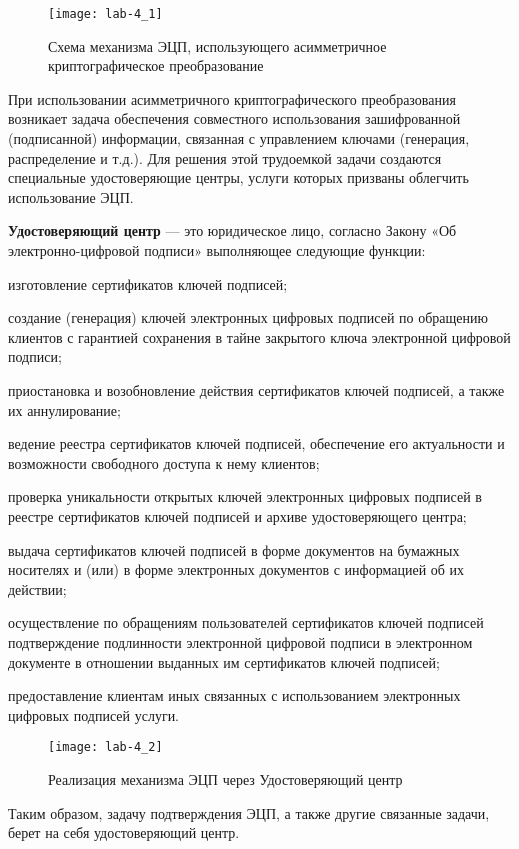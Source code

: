 \begin{figure}
  \centering
  \texttt{[image: lab-4\_1]}
  \caption{Схема механизма ЭЦП, использующего асимметричное криптографическое преобразование}\label{img:4_1}
\end{figure}
При использовании асимметричного криптографического преобразования возникает
задача обеспечения совместного использования зашифрованной (подписанной)
информации, связанная с управлением ключами (генерация, распределение и
т.д.). Для решения этой трудоемкой задачи создаются специальные
удостоверяющие центры, услуги которых призваны облегчить использование ЭЦП.

\textbf{Удостоверяющий центр} --– это юридическое лицо, согласно Закону «Об
электронно-цифровой подписи» выполняющее следующие функции:

\begin{Notes}
\item изготовление сертификатов ключей подписей;
\item  создание (генерация) ключей
    электронных цифровых подписей по обращению клиентов  с гарантией
    сохранения в тайне закрытого ключа электронной цифровой подписи;
\item приостановка и возобновление действия сертификатов ключей подписей, а
    также их аннулирование;
\item ведение реестра сертификатов ключей подписей, обеспечение его
    актуальности и
возможности свободного доступа к нему клиентов;
\item  проверка уникальности открытых ключей электронных цифровых подписей в
    реестре сертификатов ключей подписей и архиве удостоверяющего центра;
\item выдача сертификатов ключей подписей в форме документов на бумажных
    носителях
и (или) в форме электронных документов с информацией об их действии;
\item осуществление по обращениям пользователей сертификатов ключей подписей
    подтверждение подлинности электронной цифровой подписи в электронном
    документе в отношении выданных им сертификатов ключей подписей;
\item предоставление клиентам иных связанных с использованием электронных
    цифровых подписей услуги.
\end{Notes}

\begin{figure}[ht]
  \centering
  \texttt{[image: lab-4\_2]}
  \caption{Реализация механизма ЭЦП через Удостоверяющий центр }\label{img:lab4-2}
\end{figure}
Таким образом, задачу подтверждения ЭЦП, а также другие связанные задачи,
берет на себя удостоверяющий центр.

